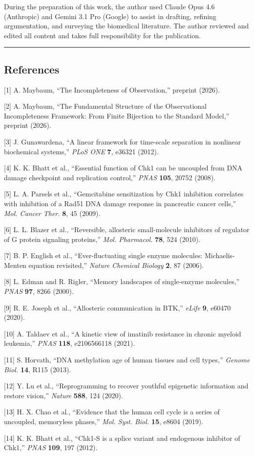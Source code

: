 \documentclass[
  11pt,
]{article}
\begin{document}
During the preparation of this work, the author used Claude Opus 4.6
(Anthropic) and Gemini 3.1 Pro (Google) to assist in drafting, refining
argumentation, and surveying the biomedical literature. The author
reviewed and edited all content and takes full responsibility for the
publication.

\begin{center}\rule{0.5\linewidth}{0.5pt}\end{center}

\hypertarget{references}{%
\subsection{References}\label{references}}

{[}1{]} A. Maybaum, ``The Incompleteness of Observation,'' preprint
(2026).

{[}2{]} A. Maybaum, ``The Fundamental Structure of the Observational
Incompleteness Framework: From Finite Bijection to the Standard Model,''
preprint (2026).

{[}3{]} J. Gunawardena, ``A linear framework for time-scale separation
in nonlinear biochemical systems,'' \emph{PLoS ONE} \textbf{7}, e36321
(2012).

{[}4{]} K. K. Bhatt et al., ``Essential function of Chk1 can be
uncoupled from DNA damage checkpoint and replication control,''
\emph{PNAS} \textbf{105}, 20752 (2008).

{[}5{]} L. A. Parsels et al., ``Gemcitabine sensitization by Chk1
inhibition correlates with inhibition of a Rad51 DNA damage response in
pancreatic cancer cells,'' \emph{Mol. Cancer Ther.} \textbf{8}, 45
(2009).

{[}6{]} L. L. Blazer et al., ``Reversible, allosteric small-molecule
inhibitors of regulator of G protein signaling proteins,'' \emph{Mol.
Pharmacol.} \textbf{78}, 524 (2010).

{[}7{]} B. P. English et al., ``Ever-fluctuating single enzyme
molecules: Michaelis-Menten equation revisited,'' \emph{Nature Chemical
Biology} \textbf{2}, 87 (2006).

{[}8{]} L. Edman and R. Rigler, ``Memory landscapes of single-enzyme
molecules,'' \emph{PNAS} \textbf{97}, 8266 (2000).

{[}9{]} R. E. Joseph et al., ``Allosteric communication in BTK,''
\emph{eLife} \textbf{9}, e60470 (2020).

{[}10{]} A. Taldaev et al., ``A kinetic view of imatinib resistance in
chronic myeloid leukemia,'' \emph{PNAS} \textbf{118}, e2106566118
(2021).

{[}11{]} S. Horvath, ``DNA methylation age of human tissues and cell
types,'' \emph{Genome Biol.} \textbf{14}, R115 (2013).

{[}12{]} Y. Lu et al., ``Reprogramming to recover youthful epigenetic
information and restore vision,'' \emph{Nature} \textbf{588}, 124
(2020).

{[}13{]} H. X. Chao et al., ``Evidence that the human cell cycle is a
series of uncoupled, memoryless phases,'' \emph{Mol. Syst. Biol.}
\textbf{15}, e8604 (2019).

{[}14{]} K. K. Bhatt et al., ``Chk1-S is a splice variant and endogenous
inhibitor of Chk1,'' \emph{PNAS} \textbf{109}, 197 (2012).
\end{document}
